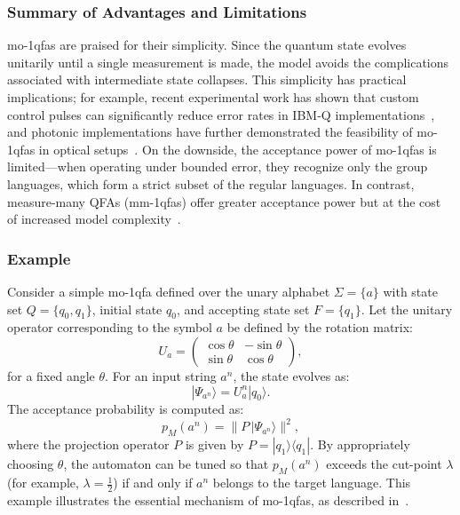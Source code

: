 \subsubsection{Summary of Advantages and Limitations}
\gls{mo-1qfa}s are praised for their simplicity. Since the quantum state evolves unitarily until a single measurement is made, the model avoids the complications associated with intermediate state collapses. This simplicity has practical implications; for example, recent experimental work has shown that custom control pulses can significantly reduce error rates in IBM-Q implementations~\cite{lussi2024implementingquantumfiniteautomaton}, and photonic implementations have further demonstrated the feasibility of \gls{mo-1qfa}s in optical setups~\cite{app11188768}. On the downside, the acceptance power of \gls{mo-1qfa}s is limited—when operating under bounded error, they recognize only the group languages, which form a strict subset of the regular languages. In contrast, measure-many QFAs (\gls{mm-1qfa}s) offer greater acceptance power but at the cost of increased model complexity~\cite{646094,10.1007/3-540-44669-9_10}.

\subsubsection{Example}
Consider a simple \gls{mo-1qfa} defined over the unary alphabet $\Sigma=\{a\}$ with state set $Q=\{q_0,q_1\}$, initial state $q_0$, and accepting state set $F=\{q_1\}$. Let the unitary operator corresponding to the symbol $a$ be defined by the rotation matrix:
\[
U_a = \begin{pmatrix}
\cos\theta & -\sin\theta \\
\sin\theta & \cos\theta
\end{pmatrix},
\]
for a fixed angle $\theta$. For an input string $a^n$, the state evolves as:
\[
|\Psi_{a^n}\rangle = U_a^n |q_0\rangle.
\]
The acceptance probability is computed as:
\[
p_M(a^n)=\|P\,|\Psi_{a^n}\rangle\|^2,
\]
where the projection operator $P$ is given by $P=|q_1\rangle\langle q_1|$. By appropriately choosing $\theta$, the automaton can be tuned so that $p_M(a^n)$ exceeds the cut-point $\lambda$ (for example, $\lambda=\frac{1}{2}$) if and only if $a^n$ belongs to the target language. This example illustrates the essential mechanism of \gls{mo-1qfa}s, as described in~\cite{moore2000quantum,brodsky2002characterizations}.

